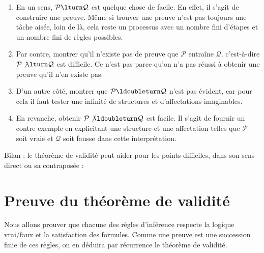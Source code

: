 \documentclass[11pt,class=report,crop=false]{standalone}
\begin{document}
\begin{enumerate}
	\item En un sens, $\mathcal{P} \lturn \mathcal{Q}$ est quelque chose de facile. En effet, il s'agit de construire une preuve. Même si trouver une preuve n'est pas toujours une tâche aisée, loin de là, cela reste un processus avec un nombre fini d'étapes et un nombre fini de règles possibles.
	
	\item Par contre, montrer qu'il n'existe pas de preuve que $\mathcal{P}$ entraîne $\mathcal{Q}$, c'est-à-dire $\mathcal{P} \not\lturn \mathcal{Q}$ est difficile.
	Ce n'est pas parce qu'on n'a pas réussi à obtenir une preuve qu'il n'en existe pas.
	
	\item D'un autre côté, montrer que $\mathcal{P} \ldoubleturn \mathcal{Q}$ n'est pas évident, car pour cela il faut tester une infinité de structures et d'affectations imaginables.
	
	\item En revanche, obtenir $\mathcal{P} \not\ldoubleturn \mathcal{Q}$ est facile. Il s'agit de fournir un contre-exemple en explicitant une structure et une affectation telles que $\mathcal{P}$ soit vraie et $\mathcal{Q}$ soit fausse dans cette interprétation.
\end{enumerate}


Bilan : le théorème de validité peut aider pour les points difficiles, dans son sens direct ou sa contraposée :\\




\section{Preuve du théorème de validité}


Nous allons prouver que chacune des règles d'inférence respecte la logique vrai/faux et la satisfaction des formules. 
Comme une preuve est une succession finie de ces règles, on en déduira par récurrence le théorème de validité.


\end{document}
